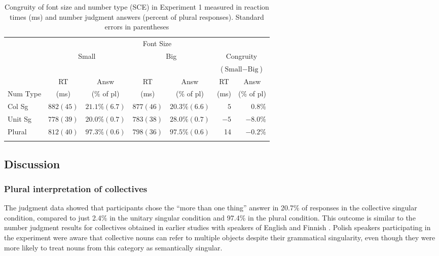 \documentclass[output=paper]{langscibook}
\begin{document}
\begin{table}
\caption{Congruity of font size and number type (SCE) in Experiment 1 measured in reaction times (ms) and number judgment answers (percent of plural responses). Standard errors in parentheses}
\label{gul-bla:tab:SCE-exp1}
\begin{tabular}{l rr rr rr}
\lsptoprule
&\multicolumn{6}{c}{Font Size}\\\cmidrule(lr){2-7}
&\multicolumn{2}{c}{\multirow{2}{*}{Small}}&\multicolumn{2}{c}{\multirow{2}{*}{Big}}&\multicolumn{2}{c}{Congruity}\\
&&&&&\multicolumn{2}{c}{($\text{Small}-\text{Big}$)}\\\cmidrule(lr){2-3}\cmidrule(lr){4-5}\cmidrule(lr){6-7}
&\multicolumn{1}{c}{RT}&\multicolumn{1}{c}{Answ}&\multicolumn{1}{c}{RT}&\multicolumn{1}{c}{Answ}&\multicolumn{1}{c}{RT}&\multicolumn{1}{c}{Answ}\\
Num Type&\multicolumn{1}{c}{(ms)}&\multicolumn{1}{c}{(\% of pl)}&\multicolumn{1}{c}{(ms)}&\multicolumn{1}{c}{(\% of pl)}&\multicolumn{1}{c}{(ms)}&\multicolumn{1}{c}{(\% of pl)}\\\midrule
Col Sg  & $882 (45)$ & $21.1\% (6.7)$ & $877 (46)$ & $20.3\% (6.6)$ & $5$  & $0.8\%$  \\
Unit Sg & $778 (39)$ & $20.0\% (0.7)$ & $783 (38)$ & $28.0\% (0.7)$ & $-5$ & $-8.0\%$ \\
Plural  & $812 (40)$ & $97.3\% (0.6)$ & $798 (36)$ & $97.5\% (0.6)$ & 14 & $-0.2\%$ \\
\lspbottomrule
\end{tabular}
\end{table}


\subsection{Discussion}

\subsubsection{Plural interpretation of collectives}
The judgment data showed that participants chose the “more than one thing” answer in 20.7\% of responses in the collective singular condition, compared to just 2.4\% in the unitary singular condition and 97.4\% in the plural condition. This outcome is similar to the number judgment results for collectives obtained in earlier studies with speakers of English \citep{bockMeaningSoundSyntax1993} and Finnish \citep{nenonenMismatchesGrammaticalNumber2010}. Polish speakers participating in the experiment were aware that collective nouns can refer to multiple objects despite their grammatical singularity, even though they were more likely to treat nouns from this category as semantically singular. 
\end{document}
